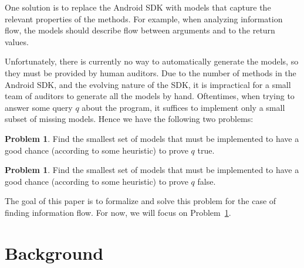 \documentclass[10pt,twocolumn]{article}
\theoremstyle{definition}
\newtheorem{problem}[theorem]{Problem}
\begin{document}
\noindent One solution is to replace the Android SDK with models that capture the relevant properties of the methods. For example, when analyzing information flow, the models should describe flow between arguments and to the return values.

Unfortunately, there is currently no way to automatically generate the models, so they must be provided by human auditors. Due to the number of methods in the Android SDK, and the evolving nature of the SDK, it is impractical for a small team of auditors to generate all the models by hand. Oftentimes, when trying to answer some query $q$ about the program, it suffices to implement only a small subset of missing models. Hence we have the following two problems:
\begin{problem}
\label{trueproblem}
Find the smallest set of models that must be implemented to have a good chance (according to some heuristic) to prove $q$ true.
\end{problem}
\begin{problem}
\label{falseproblem}
Find the smallest set of models that must be implemented to have a good chance (according to some heuristic) to prove $q$ false.
\end{problem}

\noindent The goal of this paper is to formalize and solve this problem for the case of finding information flow. For now, we will focus on Problem~\ref{trueproblem}.

\section{Background}
\end{document}
